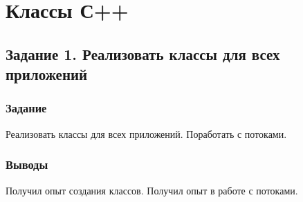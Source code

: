 \documentclass[12pt,a4paper]{report}
\begin{document}
\chapter{Классы С++}
\section{Задание 1. Реализовать классы для всех приложений}
\subsection{Задание}
\hspace{\parindent}
Реализовать классы для всех приложений. Поработать с потоками.
\subsection{Выводы}
\hspace{\parindent}
Получил опыт создания классов. Получил опыт в работе с потоками.
\end{document}
